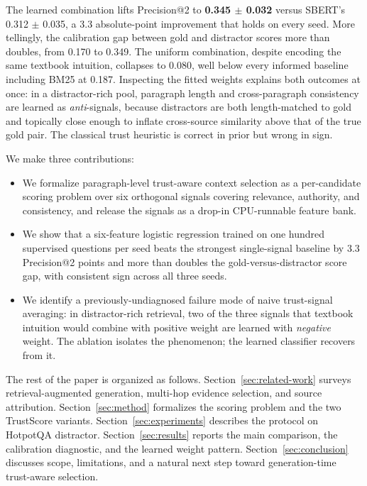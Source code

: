 The learned combination lifts Precision@2 to \textbf{0.345 $\pm$ 0.032}
versus SBERT's 0.312 $\pm$ 0.035, a 3.3 absolute-point improvement
that holds on every seed. More tellingly, the calibration gap between
gold and distractor scores more than doubles, from 0.170 to 0.349.
The uniform combination, despite encoding the same textbook intuition,
collapses to 0.080, well below every informed baseline including BM25
at 0.187. Inspecting the fitted weights explains both outcomes at
once: in a distractor-rich pool, paragraph length and cross-paragraph
consistency are learned as \emph{anti}-signals, because distractors
are both length-matched to gold and topically close enough to inflate
cross-source similarity above that of the true gold pair. The
classical trust heuristic is correct in prior but wrong in sign.

We make three contributions:
\begin{itemize}
  \item We formalize paragraph-level trust-aware context selection as
  a per-candidate scoring problem over six orthogonal signals covering
  relevance, authority, and consistency, and release the signals as a
  drop-in CPU-runnable feature bank.
  \item We show that a six-feature logistic regression trained on one
  hundred supervised questions per seed beats the strongest
  single-signal baseline by 3.3 Precision@2 points and more than
  doubles the gold-versus-distractor score gap, with consistent sign
  across all three seeds.
  \item We identify a previously-undiagnosed failure mode of naive
  trust-signal averaging: in distractor-rich retrieval, two of the
  three signals that textbook intuition would combine with positive
  weight are learned with \emph{negative} weight. The ablation
  isolates the phenomenon; the learned classifier recovers from it.
\end{itemize}

The rest of the paper is organized as follows. Section~\ref{sec:related-work}
surveys retrieval-augmented generation, multi-hop evidence selection,
and source attribution. Section~\ref{sec:method} formalizes the
scoring problem and the two TrustScore variants.
Section~\ref{sec:experiments} describes the protocol on HotpotQA
distractor. Section~\ref{sec:results} reports the main comparison,
the calibration diagnostic, and the learned weight pattern.
Section~\ref{sec:conclusion} discusses scope, limitations, and a
natural next step toward generation-time trust-aware selection.
